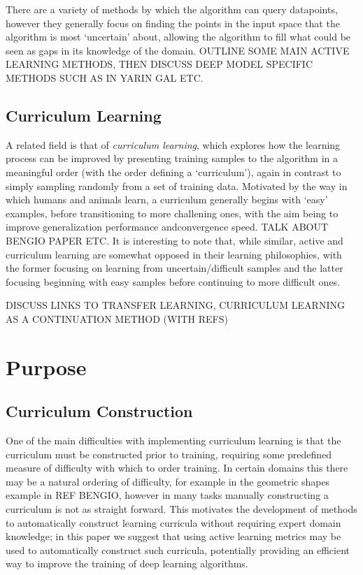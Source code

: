 \documentclass[a4paper,11pt]{article}
\begin{document}
There are a variety of methods by which the algorithm can query datapoints, however they generally focus on finding the points in the input space that the algorithm is most `uncertain' about, allowing the algorithm to fill what could be seen as gaps in its knowledge of the domain. OUTLINE SOME MAIN ACTIVE LEARNING METHODS, THEN DISCUSS DEEP MODEL SPECIFIC METHODS SUCH AS IN YARIN GAL ETC.

\subsection{Curriculum Learning}
A related field is that of \textit{curriculum learning}, which explores how the learning process can be improved by presenting training samples to the algorithm in a meaningful order (with the order defining a `curriculum'), again in contrast to simply sampling randomly from a set of training data. Motivated by the way in which humans and animals learn, a curriculum generally begins with `easy' examples, before transitioning to more challening ones, with the aim being to improve generalization performance andconvergence speed. TALK ABOUT BENGIO PAPER ETC. It is interesting to note that, while similar, active and curriculum learning are somewhat opposed in their learning philosophies, with the former focusing on learning from uncertain/difficult samples and the latter focusing beginning with easy samples before continuing to more difficult ones.

DISCUSS LINKS TO TRANSFER LEARNING, CURRICULUM LEARNING AS A CONTINUATION METHOD (WITH REFS)

\section{Purpose}
\subsection{Curriculum Construction}
One of the main difficulties with implementing curriculum learning is that the curriculum must be constructed prior to training, requiring some predefined measure of difficulty with which to order training. In certain domains this there may be a natural ordering of difficulty, for example in the geometric shapes example in REF BENGIO, however in many tasks manually constructing a curriculum is not as straight forward. This motivates the development of methods to automatically construct learning curricula without requiring expert domain knowledge; in this paper we suggest that using active learning metrics may be used to automatically construct such curricula, potentially providing an efficient way to improve the training of deep learning algorithms. 
\end{document}
